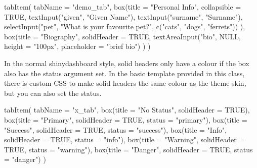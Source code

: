 \documentclass[
]{book}
\newenvironment{Shaded}{\begin{snugshade}}{\end{snugshade}}
\newcommand{\AttributeTok}[1]{\textcolor[rgb]{0.77,0.63,0.00}{#1}}
\newcommand{\ConstantTok}[1]{\textcolor[rgb]{0.00,0.00,0.00}{#1}}
\newcommand{\FunctionTok}[1]{\textcolor[rgb]{0.00,0.00,0.00}{#1}}
\newcommand{\NormalTok}[1]{#1}
\newcommand{\StringTok}[1]{\textcolor[rgb]{0.31,0.60,0.02}{#1}}
\begin{document}
\begin{Shaded}
\begin{Highlighting}[]
\FunctionTok{tabItem}\NormalTok{(}
    \AttributeTok{tabName =} \StringTok{"demo\_tab"}\NormalTok{,}
    \FunctionTok{box}\NormalTok{(}\AttributeTok{title =} \StringTok{"Personal Info"}\NormalTok{,}
        \AttributeTok{collapsible =} \ConstantTok{TRUE}\NormalTok{, }
        \FunctionTok{textInput}\NormalTok{(}\StringTok{"given"}\NormalTok{, }\StringTok{"Given Name"}\NormalTok{),}
        \FunctionTok{textInput}\NormalTok{(}\StringTok{"surname"}\NormalTok{, }\StringTok{"Surname"}\NormalTok{),}
        \FunctionTok{selectInput}\NormalTok{(}\StringTok{"pet"}\NormalTok{, }\StringTok{"What is your favourite pet?"}\NormalTok{, }\FunctionTok{c}\NormalTok{(}\StringTok{"cats"}\NormalTok{, }\StringTok{"dogs"}\NormalTok{, }\StringTok{"ferrets"}\NormalTok{))}
\NormalTok{    ),}
    \FunctionTok{box}\NormalTok{(}\AttributeTok{title =} \StringTok{"Biography"}\NormalTok{,}
        \AttributeTok{solidHeader =} \ConstantTok{TRUE}\NormalTok{, }
        \FunctionTok{textAreaInput}\NormalTok{(}\StringTok{"bio"}\NormalTok{, }\ConstantTok{NULL}\NormalTok{, }\AttributeTok{height =} \StringTok{"100px"}\NormalTok{, }\AttributeTok{placeholder =} \StringTok{"brief bio"}\NormalTok{)}
\NormalTok{    )}
\NormalTok{)}
\end{Highlighting}
\end{Shaded}

In the normal shinydashboard style, solid headers only have a colour if the box also has the status argument set. In the basic template provided in this class, there is custom CSS to make solid headers the same colour as the theme skin, but you can also set the status.

\begin{Shaded}
\begin{Highlighting}[]
\FunctionTok{tabItem}\NormalTok{(}
    \AttributeTok{tabName =} \StringTok{"x\_tab"}\NormalTok{,}
    \FunctionTok{box}\NormalTok{(}\AttributeTok{title =} \StringTok{"No Status"}\NormalTok{, }\AttributeTok{solidHeader =} \ConstantTok{TRUE}\NormalTok{),}
    \FunctionTok{box}\NormalTok{(}\AttributeTok{title =} \StringTok{"Primary"}\NormalTok{,   }\AttributeTok{solidHeader =} \ConstantTok{TRUE}\NormalTok{, }\AttributeTok{status =} \StringTok{"primary"}\NormalTok{),}
    \FunctionTok{box}\NormalTok{(}\AttributeTok{title =} \StringTok{"Success"}\NormalTok{,   }\AttributeTok{solidHeader =} \ConstantTok{TRUE}\NormalTok{, }\AttributeTok{status =} \StringTok{"success"}\NormalTok{),}
    \FunctionTok{box}\NormalTok{(}\AttributeTok{title =} \StringTok{"Info"}\NormalTok{,      }\AttributeTok{solidHeader =} \ConstantTok{TRUE}\NormalTok{, }\AttributeTok{status =} \StringTok{"info"}\NormalTok{),}
    \FunctionTok{box}\NormalTok{(}\AttributeTok{title =} \StringTok{"Warning"}\NormalTok{,   }\AttributeTok{solidHeader =} \ConstantTok{TRUE}\NormalTok{, }\AttributeTok{status =} \StringTok{"warning"}\NormalTok{),}
    \FunctionTok{box}\NormalTok{(}\AttributeTok{title =} \StringTok{"Danger"}\NormalTok{,    }\AttributeTok{solidHeader =} \ConstantTok{TRUE}\NormalTok{, }\AttributeTok{status =} \StringTok{"danger"}\NormalTok{)}
\NormalTok{)}
\end{Highlighting}
\end{Shaded}
\end{document}
